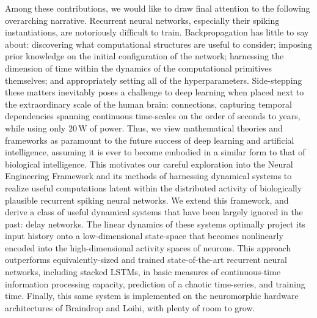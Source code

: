 Among these contributions, we would like to draw final attention to the following overarching narrative.
Recurrent neural networks, especially their spiking instantiations, are notoriously difficult to train.
Backpropagation has little to say about: discovering what computational structures are useful to consider; imposing prior knowledge on the initial configuration of the network; harnessing the dimension of time within the dynamics of the computational primitives themselves; and appropriately setting all of the hyperparameters.
Side-stepping these matters inevitably poses a challenge to deep learning when placed next to the extraordinary scale of the human brain:  connections, capturing temporal dependencies spanning continuous time-scales on the order of seconds to years, while using only $20$\,W of power.
Thus, we view mathematical theories and frameworks as paramount to the future success of deep learning and artificial intelligence, assuming it is ever to become embodied in a similar form to that of biological intelligence.
This motivates our careful exploration into the Neural Engineering Framework and its methods of harnessing dynamical systems to realize useful computations latent within the distributed activity of biologically plausible recurrent spiking neural networks.
We extend this framework, and derive a class of useful dynamical systems that have been largely ignored in the past: delay networks.
The linear dynamics of these systems optimally project its input history onto a low-dimensional state-space that becomes nonlinearly encoded into the high-dimensional activity spaces of neurons.
This approach outperforms equivalently-sized and trained state-of-the-art recurrent neural networks, including stacked LSTMs, in basic measures of continuous-time information processing capacity, prediction of a chaotic time-series, and training time.
Finally, this same system is implemented on the neuromorphic hardware architectures of Braindrop and Loihi, with plenty of room to grow.


